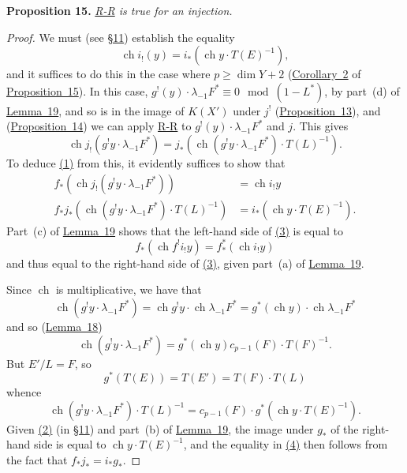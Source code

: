 \documentclass{article}
\newenvironment{itenv}[1]
  {\phantomsection\par\medskip\noindent\textbf{#1.}\itshape}
  {\medskip}
\renewcommand{\geq}{\geqslant}
\DeclareMathOperator{\ch}{ch}
\newcommand{\oldpage}[1]{\marginpar{\footnotesize$\Big\vert$ \textit{p.~#1}}}
\begin{document}
\oldpage{129}
\begin{itenv}{Proposition 15}
\label{proposition15}
  \hyperref[theoremriemannroch]{R-R} is true for an injection.
\end{itenv}

\begin{proof}
  We must (see \hyperref[section11]{\S11}) establish the equality
  \[
  \label{proposition15equation1}
    \ch i_!(y) = i_*(\ch y\cdot T(E)^{-1}),
    \tag{1}
  \]
  and it suffices to do this in the case where $p\geq\dim Y+2$ (\hyperref[corollary2]{Corollary~2} of \hyperref[proposition15]{Proposition~15}).
  In this case, $g^!(y)\cdot\lambda_{-1}F^*\equiv0\mod(1-L^*)$, by part~(d) of \hyperref[lemma19]{Lemma~19}, and so is in the image of $K(X')$ under $j^!$ (\hyperref[proposition13]{Proposition~13}), and (\hyperref[proposition14]{Proposition~14}) we can apply \hyperref[theoremriemannroch]{R-R} to $g^!(y)\cdot\lambda_{-1}F^*$ and $j$.
  This gives
  \[
  \label{proposition15equation2}
    \ch j_!(g^! y\cdot\lambda_{-1}F^*)
    = j_*(\ch(g^! y\cdot \lambda_{-1}F^*)\cdot T(L)^{-1}).
    \tag{2}
  \]
  To deduce \hyperref[proposition15equation1]{(1)} from this, it evidently suffices to show that
  \begin{align*}
  \label{proposition15equation3}
    f_*(\ch j_!(g^!y\cdot\lambda_{-1}F^*)) &= \ch i_! y
    \tag{3}
  \\
  \label{proposition15equation4}f_*j_*(\ch(g^!y\cdot\lambda_{-1}F^*)\cdot T(L)^{-1}) &= i_*(\ch y\cdot T(E)^{-1}).
    \tag{4}
  \end{align*}
  Part~(c) of \hyperref[lemma19]{Lemma~19} shows that the left-hand side of \hyperref[proposition15equation3]{(3)} is equal to
  \[
    f_*(\ch f^!i_!y) = f_*^*(\ch i_!y)
  \]
  and thus equal to the right-hand side of \hyperref[proposition15equation3]{(3)}, given part~(a) of \hyperref[lemma19]{Lemma~19}.

  Since $\ch$ is multiplicative, we have that
  \[
    \ch(g^!y\cdot\lambda_{-1}F^*)
    = \ch g^!y\cdot\ch\lambda_{-1}F^*
    = g^*(\ch y)\cdot\ch\lambda_{-1}F^*
  \]
  and so (\hyperref[lemma18]{Lemma~18})
  \[
    \ch(g^!y\cdot\lambda_{-1}F^*) = g^*(\ch y)c_{p-1}(F)\cdot T(F)^{-1}.
  \]
  But $E'/L=F$, so
  \[
    g^*(T(E)) = T(E') = T(F)\cdot T(L)
  \]
  whence
  \[
    \ch(g^!y\cdot\lambda_{-1}F^*)\cdot T(L)^{-1} = c_{p-1}(F)\cdot g^*(\ch y\cdot T(E)^{-1}).
  \]
  Given \hyperref[section11equation2]{(2)} (in \hyperref[section11]{\S11}) and part~(b) of \hyperref[lemma19]{Lemma~19}, the image under $g_*$ of the right-hand side is equal to $\ch y\cdot T(E)^{-1}$, and the equality in \hyperref[proposition15equation4]{(4)} then follows from the fact that $f_*j_*=i_*g_*$.
\end{proof}
\end{document}
